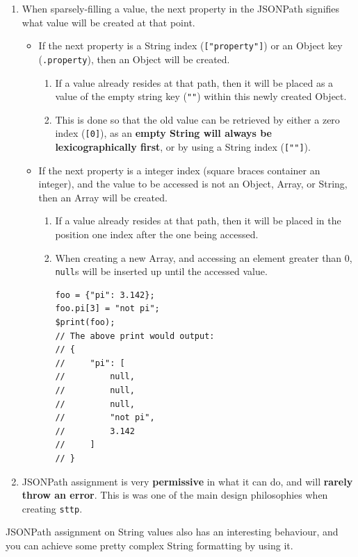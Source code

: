 \documentclass[]{full}
\theoremstyle{definition}
\begin{document}
\begin{enumerate}
    \item When sparsely-filling a value, the next property in the JSONPath signifies what value will be created at that point.
    \begin{itemize}
        \item If the next property is a String index (\verb|["property"]|) or an Object key (\verb|.property|), then an Object will be created.
        \begin{enumerate}
            \item If a value already resides at that path, then it will be placed as a value of the empty string key (\verb|""|) within this newly created Object.
            \item This is done so that the old value can be retrieved by either a zero index (\verb|[0]|), as an \textbf{empty String will always be lexicographically first}, or by using a String index (\verb|[""]|).
        \end{enumerate}
        \item If the next property is a integer index (square braces container an integer), and the value to be accessed is not an Object, Array, or String, then an Array will be created.
        \begin{enumerate}
            \item If a value already resides at that path, then it will be placed in the position one index after the one being accessed.
            \item When creating a new Array, and accessing an element greater than 0, \verb|null|s will be inserted up until the accessed value.
            \begin{verbatim}
foo = {"pi": 3.142};
foo.pi[3] = "not pi";
$print(foo);
// The above print would output:
// {
//     "pi": [
//         null,
//         null,
//         null,
//         "not pi",
//         3.142
//     ]
// }
            \end{verbatim}
        \end{enumerate}
    \end{itemize}
    \item JSONPath assignment is very \textbf{permissive} in what it can do, and will \textbf{rarely throw an error}. This is was one of the main design philosophies when creating \verb|sttp|.
\end{enumerate}

JSONPath assignment on String values also has an interesting behaviour, and you can achieve some pretty complex String formatting by using it.
\end{document}
